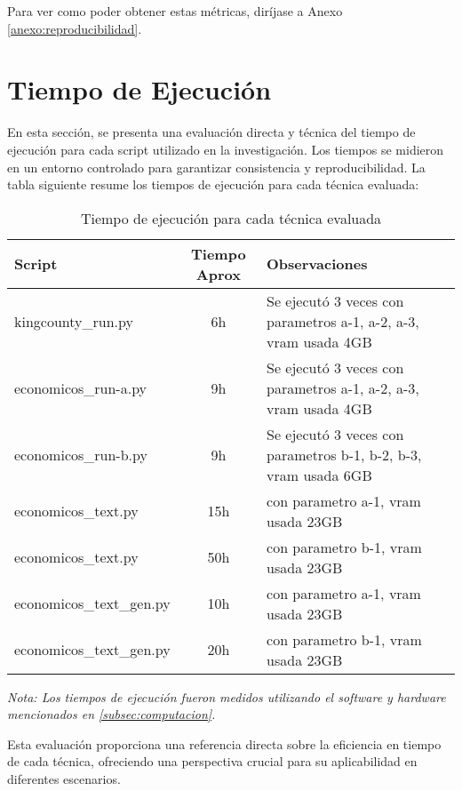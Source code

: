 Para ver como poder obtener estas métricas, diríjase a Anexo \ref{anexo:reproducibilidad}.

\section{Tiempo de Ejecución}

En esta sección, se presenta una evaluación directa y técnica del tiempo de ejecución para cada script utilizado en la investigación. Los tiempos se midieron en un entorno controlado para garantizar consistencia y reproducibilidad. La tabla siguiente resume los tiempos de ejecución para cada técnica evaluada:

\begin{table}[h]
\centering
\begin{tabular}{|l|c|p{5cm}|}
\hline
\rowcolor[gray]{0.8}
\textbf{Script} & \textbf{Tiempo Aprox} & \textbf{Observaciones} \\
\hline
kingcounty\_run.py & 6h & Se ejecutó 3 veces con parametros a-1, a-2, a-3, vram usada 4GB  \\
\hline
economicos\_run-a.py & 9h & Se ejecutó 3 veces con parametros a-1, a-2, a-3, vram usada 4GB  \\
\hline
economicos\_run-b.py & 9h & Se ejecutó 3 veces con parametros b-1, b-2, b-3, vram usada 6GB  \\
\hline
economicos\_text.py & 15h & con parametro a-1, vram usada 23GB  \\
\hline
economicos\_text.py & 50h & con parametro b-1, vram usada 23GB  \\
\hline
economicos\_text\_gen.py & 10h & con parametro a-1, vram usada 23GB  \\
\hline
economicos\_text\_gen.py & 20h & con parametro b-1, vram usada 23GB  \\
\hline
\end{tabular}
\caption{Tiempo de ejecución para cada técnica evaluada}
\label{table:tiempo-ejecucion}
\end{table}

\textit{Nota: Los tiempos de ejecución fueron medidos utilizando el software y hardware mencionados en \ref{subsec:computacion}.}

Esta evaluación proporciona una referencia directa sobre la eficiencia en tiempo de cada técnica, ofreciendo una perspectiva crucial para su aplicabilidad en diferentes escenarios.
